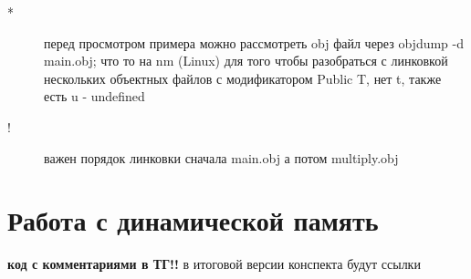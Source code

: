 \documentclass[a4paper, 12pt]{article}
\begin{document}
    \begin{description}
        \item[*] перед просмотром примера можно рассмотреть obj файл через objdump -d main.obj; что то на nm (Linux) для того чтобы разобраться с линковкой нескольких объектных файлов с модификатором Public T, нет t, также есть u - undefined
        \item[!] важен порядок линковки сначала main.obj а потом multiply.obj 
    \end{description}
    \newpage
    \section*{Работа с динамической память}
    \hypertarget{dynamic_mem}{}
    \textbf{код с комментариями в ТГ!!} в итоговой версии конспекта будут ссылки
    \newpage
\end{document}
